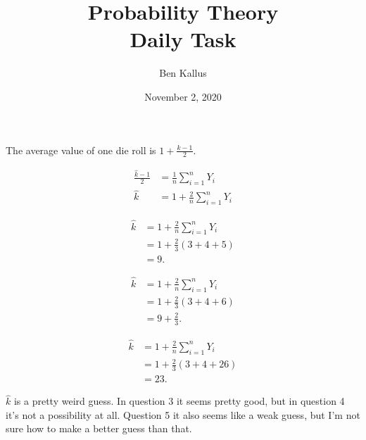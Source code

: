\documentclass[12pt]{article}
\title{Probability Theory \\ Daily Task}
\author{Ben Kallus}
\date{November 2, 2020}
\begin{document}
\color{white}
\pagecolor{black}
\maketitle

 The average value of one die roll is $1 + \frac{k-1}2$.

\medskip
{}
\begin{align*}
    \frac{\hat k-1}{2} &= \frac1n\sum_{i=1}^nY_i \\
    \hat k &= 1 + \frac2n\sum_{i=1}^nY_i
\end{align*}

\medskip
{}
\begin{align*}
    \hat k &= 1 + \frac2n\sum_{i=1}^nY_i \\
           &= 1 + \frac23(3 + 4 + 5) \\
           &= 9.
\end{align*}

\medskip
{}
\begin{align*}
    \hat k &= 1 + \frac2n\sum_{i=1}^nY_i \\
           &= 1 + \frac23(3 + 4 + 6) \\
           &= 9 + \frac23.
\end{align*}

\medskip
{}
\begin{align*}
    \hat k &= 1 + \frac2n\sum_{i=1}^nY_i \\
           &= 1 + \frac23(3 + 4 + 26) \\
           &= 23.
\end{align*}

\medskip
{} $\hat k$ is a pretty weird guess. In question 3 it seems pretty good, but in question 4 it's not a possibility at all. Question 5 it also seems like a weak guess, but I'm not sure how to make a better guess than that.
\end{document}
